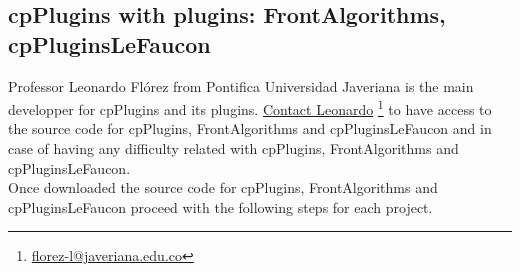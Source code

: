\documentclass[12pt]{article}
\begin{document}
\subsection{cpPlugins with plugins: FrontAlgorithms, cpPluginsLeFaucon}

Professor Leonardo Fl\'{o}rez from Pontifica Universidad Javeriana is the main developper for cpPlugins and its plugins. \href{mailito:florez-l@javeriana.edu.co}{\color{blue} Contact Leonardo}
\footnote{\url{florez-l@javeriana.edu.co}} to have access to the source code for cpPlugins, FrontAlgorithms and cpPluginsLeFaucon and in case of having any difficulty related with cpPlugins, FrontAlgorithms and cpPluginsLeFaucon.\\

Once downloaded the source code for cpPlugins, FrontAlgorithms and cpPluginsLeFaucon proceed with the following steps for each project.\\
\end{document}
